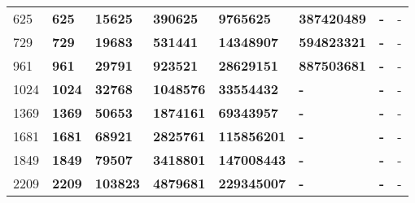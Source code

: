 \begin{table}[h]
\begin{tabular}{|l|lllllll}
625          & \textbf{625}             & \textbf{15625}                                & \textbf{390625}                     & \textbf{9765625}                      & \textbf{387420489}                     & \textbf{-}                               & -                                         \\ \cline{1-1}
729          & \textbf{729}             & \textbf{19683}                                & \textbf{531441}                     & \textbf{14348907}                     & \textbf{594823321}                     & \textbf{-}                               & -                                         \\ \cline{1-1}
961          & \textbf{961}             & \textbf{29791}                                & \textbf{923521}                     & \textbf{28629151}                     & \textbf{887503681}                     & \textbf{-}                               & -                                         \\ \cline{1-1}
1024         & \textbf{1024}            & \textbf{32768}                                & \textbf{1048576}                    & \textbf{33554432}                     & \textbf{-}                             & \textbf{-}                               & -                                         \\ \cline{1-1}
1369         & \textbf{1369}            & \textbf{50653}                                & \textbf{1874161}                    & \textbf{69343957}                     & \textbf{-}                             & \textbf{-}                               & -                                         \\ \cline{1-1}
1681         & \textbf{1681}            & \textbf{68921}                                & \textbf{2825761}                    & \textbf{115856201}                    & \textbf{-}                             & \textbf{-}                               & -                                         \\ \cline{1-1}
1849         & \textbf{1849}            & \textbf{79507}                                & \textbf{3418801}                    & \textbf{147008443}                    & \textbf{-}                             & \textbf{-}                               & -                                         \\ \cline{1-1}
2209         & \textbf{2209}            & \textbf{103823}                               & \textbf{4879681}                    & \textbf{229345007}                    & \textbf{-}                             & \textbf{-}                               & -                                         \\ \cline{1-1}

\end{tabular}
\end{table}
